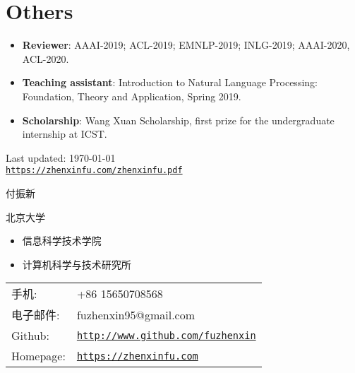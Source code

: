 \documentclass[letterpaper]{article}
\def\footerlink{https://zhenxinfu.com/zhenxinfu.pdf}
\begin{document}
\section*{Others}
\begin{itemize}
  \item \textbf{Reviewer}: AAAI-2019; ACL-2019; EMNLP-2019; INLG-2019; AAAI-2020, ACL-2020.
  \item \textbf{Teaching assistant}: Introduction to Natural Language Processing: Foundation, Theory and Application, Spring 2019.
  \item \textbf{Scholarship}: Wang Xuan Scholarship, first prize for the undergraduate internship at ICST.
\end{itemize}


\bigskip


\begin{center}
  \begin{footnotesize}
    Last updated: \today \\
    \href{\footerlink}{\texttt{\footerlink}}
  \end{footnotesize}
\end{center}

\clearpage


{\huge 付振新}


\vspace{0.25in}

\begin{minipage}{0.45\linewidth}
  \begin{large}北京大学\end{large}
  \begin{itemize}
    \itemsep=-0.02in
      \item 信息科学技术学院
      \item 计算机科学与技术研究所
  \end{itemize}
  
\end{minipage}
\begin{minipage}{0.45\linewidth}
  \begin{tabular}{ll}
    手机: & +86 15650708568 \\
    电子邮件: & fuzhenxin95@gmail.com \\
    Github: & \href{https://www.github.com/fuzhenxin}{\tt http://www.github.com/fuzhenxin} \\
    Homepage: & \href{http://zhenxinfu.com}{\tt https://zhenxinfu.com} \\
  \end{tabular}
\end{minipage}
\end{document}
